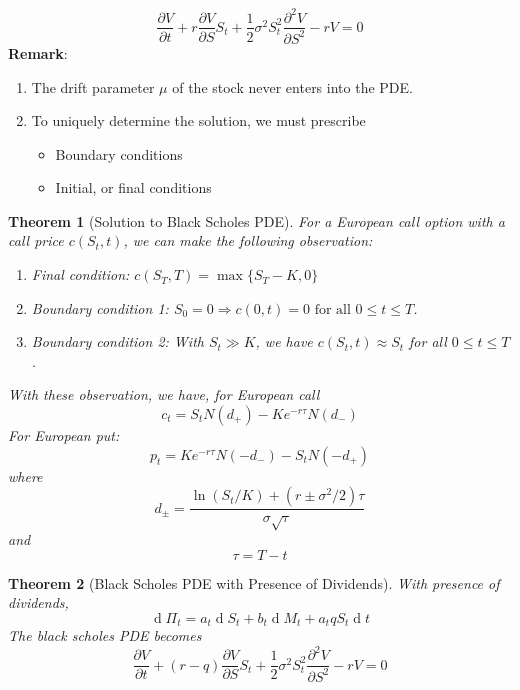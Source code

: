 \documentclass[12pt]{article}
\newtheorem{theorem}{Theorem}[section]
\theoremstyle{definition}
\DeclareMathOperator{\diff}{d}
\begin{document}
\[
\frac{\partial V}{\partial t}+r\frac{\partial V}{\partial S}S_t +\frac{1}{2}\sigma^2S_t^2\frac{\partial^2 V}{\partial S^2}-rV=0
\]
\textbf{Remark}:
\begin{enumerate}
  \item The drift parameter $\mu$ of the stock never enters into the PDE.
  \item To uniquely determine the solution, we must prescribe
  \begin{itemize}
    \item Boundary conditions
    \item Initial, or final conditions
  \end{itemize}
\end{enumerate}
\begin{theorem}[Solution to Black Scholes PDE]
\normalfont For a European call option with a call price $c(S_t,t)$, we can make the following observation:
\begin{enumerate}
  \item Final condition: $c(S_T,T)=\max\{S_T-K, 0\}$
  \item Boundary condition 1: $S_0=0\Rightarrow c(0,t)=0\text{ for all }0\leq t\leq T$.
  \item Boundary condition 2: With $S_t\gg K$, we have $c(S_t,t)\approx S_t$ for all $0\leq t\leq T$.
\end{enumerate}
With these observation, we have, for European call
\[
c_t= S_tN(d_{+})-Ke^{-r\tau}N(d_{-})
\]
For European put:
\[
p_t=Ke^{-r\tau}N(-d_{-})-S_tN(-d_+)
\]
where 
\[
d_{\pm}=\frac{\ln(S_t/K)+(r\pm \sigma^2/2)\tau}{\sigma\sqrt{\tau}}
\]
and
\[
\tau = T-t
\]
\end{theorem}
\begin{theorem}[Black Scholes PDE with Presence of Dividends]
\normalfont With presence of dividends,
\[
\diff \Pi_t = a_t\diff S_t+b_t\diff M_t+a_tqS_t\diff t
\] 
The black scholes PDE becomes
\[
\frac{\partial V}{\partial t}+(r-q)\frac{\partial V}{\partial S}S_t +\frac{1}{2}\sigma^2S_t^2\frac{\partial^2 V}{\partial S^2}-rV=0
\]
\end{theorem}
\end{document}
